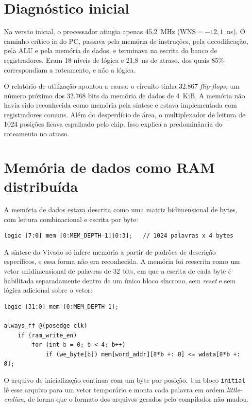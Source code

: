 \section{Diagnóstico inicial}

Na versão inicial, o processador atingia apenas 45,2~MHz
($\mathrm{WNS} = -12{,}1$~ns). O caminho crítico ia do PC, passava pela
memória de instruções, pela decodificação, pela ALU e pela memória de
dados, e terminava na escrita do banco de registradores. Eram 18 níveis de
lógica e 21,8~ns de atraso, dos quais 85\% correspondiam a roteamento, e não
a lógica.

O relatório de utilização apontou a causa: o circuito tinha 32.867
\textit{flip-flops}, um número próximo dos 32.768 bits da memória de dados
de 4~KiB. A memória não havia sido reconhecida como memória pela síntese e
estava implementada com registradores comuns. Além do desperdício de área,
o multiplexador de leitura de 1024 posições ficava espalhado pelo chip. Isso
explica a predominância do roteamento no atraso.

\section{Memória de dados como RAM distribuída}

A memória de dados estava descrita como uma matriz bidimensional de bytes,
com leitura combinacional e escrita por byte:

\begin{lstlisting}
logic [7:0] mem [0:MEM_DEPTH-1][0:3];   // 1024 palavras x 4 bytes
\end{lstlisting}

A síntese do Vivado só infere memória a partir de padrões de descrição
específicos, e essa forma não era reconhecida. A memória foi reescrita como
um vetor unidimensional de palavras de 32 bits, em que a escrita de cada byte
é habilitada separadamente dentro de um único bloco síncrono, sem
\textit{reset} e sem lógica adicional sobre o vetor:

\begin{lstlisting}
logic [31:0] mem [0:MEM_DEPTH-1];

always_ff @(posedge clk)
    if (ram_write_en)
        for (int b = 0; b < 4; b++)
            if (we_byte[b]) mem[word_addr][8*b +: 8] <= wdata[8*b +: 8];
\end{lstlisting}

O arquivo de inicialização continua com um byte por posição. Um bloco
\texttt{initial} lê esse arquivo para um vetor temporário e monta cada palavra
em ordem \textit{little-endian}, de forma que o formato dos arquivos gerados
pelo compilador não mudou.

